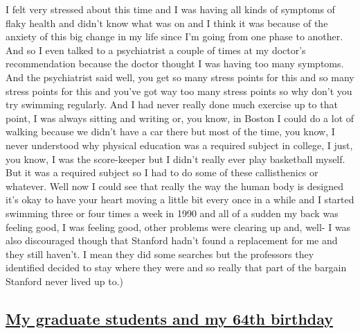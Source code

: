 \documentclass[]{article}
\begin{document}
I felt very stressed about this time and I was having all kinds of
symptoms of flaky health and didn't know what was on and I think it was
because of the anxiety of this big change in my life since I'm going
from one phase to another. And so I even talked to a psychiatrist a
couple of times at my doctor's recommendation because the doctor thought
I was having too many symptoms. And the psychiatrist said well, you get
so many stress points for this and so many stress points for this and
you've got way too many stress points so why don't you try swimming
regularly. And I had never really done much exercise up to that point, I
was always sitting and writing or, you know, in Boston I could do a lot
of walking because we didn't have a car there but most of the time, you
know, I never understood why physical education was a required subject
in college, I just, you know, I was the score-keeper but I didn't really
ever play basketball myself. But it was a required subject so I had to
do some of these callisthenics or whatever. Well now I could see that
really the way the human body is designed it's okay to have your heart
moving a little bit every once in a while and I started swimming three
or four times a week in 1990 and all of a sudden my back was feeling
good, I was feeling good, other problems were clearing up and, well- I
was also discouraged though that Stanford hadn't found a replacement for
me and they still haven't. I mean they did some searches but the
professors they identified decided to stay where they were and so really
that part of the bargain Stanford never lived up to.)

\subsection{\texorpdfstring{\href{http://webofstories.com/play/17137}{My
graduate students and my 64th
birthday}}{My graduate students and my 64th birthday}}\label{my-graduate-students-and-my-64th-birthday}
\end{document}
